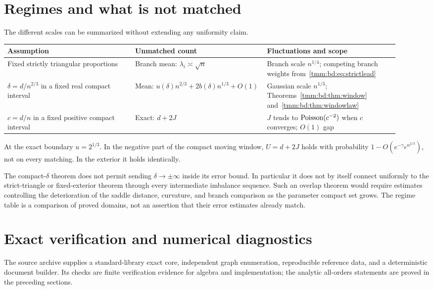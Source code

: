 \documentclass[11pt,letterpaper]{article}
\theoremstyle{remark}\newtheorem{remark}[theorem]{Remark}
\begin{document}
\section{Regimes and what is not matched}\label{tmm:bd:sec:regimes}
The different scales can be summarized without extending any uniformity claim.
\begin{center}
\small
\begin{tabular}{@{}>{\raggedright\arraybackslash}p{0.30\linewidth}>{\raggedright\arraybackslash}p{0.31\linewidth}>{\raggedright\arraybackslash}p{0.31\linewidth}@{}}
\toprule
Assumption & Unmatched count & Fluctuations and scope\\
\midrule
Fixed strictly triangular proportions & Branch mean: $\lambda_i\asymp\sqrt n$ & Branch scale $n^{1/4}$; competing branch weights from~\eqref{tmm:bd:eq:strictlead}\\[5pt]
$\delta=d/n^{2/3}$ in a fixed real compact interval & Mean: $u(\delta)n^{2/3}+2b(\delta)n^{1/3}+O(1)$ & Gaussian scale $n^{1/3}$; Theorems~\ref{tmm:bd:thm:window} and~\ref{tmm:bd:thm:windowlaw}\\[5pt]
$c=d/n$ in a fixed positive compact interval & Exact: $d+2J$ & $J$ tends to $\operatorname{Poisson}(c^{-2})$ when $c$ converges; $O(1)$ gap\\
\bottomrule
\end{tabular}
\end{center}
At the exact boundary $u=2^{1/3}$. In the negative part of the compact moving window, $U=d+2J$ holds with probability $1-O(e^{-\gamma_Kn^{2/3}})$, not on every matching. In the exterior it holds identically.

The compact-$\delta$ theorem does not permit sending $\delta\to\pm\infty$ inside its error bound. In particular it does not by itself connect uniformly to the strict-triangle or fixed-exterior theorem through every intermediate imbalance sequence. Such an overlap theorem would require estimates controlling the deterioration of the saddle distance, curvature, and branch comparison as the parameter compact set grows. The regime table is a comparison of proved domains, not an assertion that their error estimates already match.

\section{Exact verification and numerical diagnostics}\label{tmm:bd:sec:verification}
The source archive supplies a standard-library exact core, independent graph enumeration, reproducible reference data, and a deterministic document builder. Its checks are finite verification evidence for algebra and implementation; the analytic all-orders statements are proved in the preceding sections.
\end{document}
